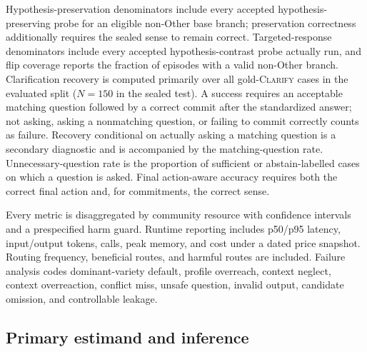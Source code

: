 \documentclass[preprint,12pt,authoryear]{elsarticle}
\newcommand{\clarify}{\ifmmode\operatorname{CLARIFY}\else\textsc{Clarify}\fi}
\begin{document}
Hypothesis-preservation denominators include every accepted
hypothesis-preserving probe for an eligible non-Other base branch;
preservation correctness additionally requires
the sealed sense to remain correct. Targeted-response denominators include
every accepted hypothesis-contrast probe actually run, and flip coverage reports the
fraction of episodes with a valid non-Other branch. Clarification recovery is
computed primarily over all gold-\clarify{} cases in the evaluated split
($N=150$ in the sealed test). A success requires an acceptable matching
question followed by a correct commit after the standardized answer; not
asking, asking a nonmatching question, or failing to commit correctly counts
as failure. Recovery conditional on actually asking a matching question is a
secondary diagnostic and is accompanied by the matching-question rate.
Unnecessary-question
rate is the proportion of sufficient or abstain-labelled cases on which a
question is asked. Final action-aware accuracy requires both the correct final
action and, for commitments, the correct sense.

Every metric is disaggregated by community resource with confidence intervals
and a prespecified harm guard. Runtime reporting includes p50/p95 latency,
input/output tokens, calls, peak memory, and cost under a dated price snapshot.
Routing frequency, beneficial routes, and harmful routes are included. Failure
analysis codes dominant-variety default, profile overreach, context neglect,
context overreaction, conflict miss, unsafe question, invalid output, candidate
omission, and controllable leakage.

\subsection{Primary estimand and inference}
\end{document}
